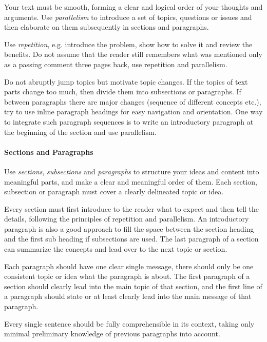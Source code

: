 \documentclass[11pt, a4paper,oneside,chapterprefix=false]{scrbook}
\begin{document}
Your text must be smooth, forming a clear and logical order of your thoughts and arguments. Use \emph{parallelism} to introduce a set of topics, questions or issues and then elaborate on them subsequently in sections and paragraphs.

Use \emph{repetition}, e.g. introduce the problem, show how to solve it and review the benefits. Do not assume that the reader still remembers what was mentioned only as a passing comment three pages back, use repetition and parallelism.

Do not abruptly jump topics but motivate topic changes. If the topics of text parts change too much, then divide them into subsections or paragraphs. If between paragraphs there are major changes (sequence of different concepts etc.), try to use inline paragraph headings for easy navigation and orientation. One way to integrate such paragraph sequences is to write an introductory paragraph at the beginning of the section and use parallelism.

\paragraph*{Sections and Paragraphs}

Use \textit{sections}, \textit{subsections} and \textit{paragraphs} to structure your ideas and content into meaningful parts, and make a clear and meaningful order of them. Each section, subsection or paragraph must cover a clearly delineated topic or idea.

Every section must first introduce to the reader what to expect and then tell the details, following the principles of repetition and parallelism. An introductory paragraph is also a good approach to fill the space between the section heading and the first sub heading if subsections are used. The last paragraph of a section can summarize the concepts and lead over to the next topic or section.

Each paragraph should have one clear single message, there should only be one consistent topic or idea what the paragraph is about. The first paragraph of a section should clearly lead into the main topic of that section, and the first line of a paragraph should state or at least clearly lead into the main message of that paragraph.

Every single sentence should be fully comprehensible in its context, taking only minimal preliminary knowledge of previous paragraphs into account.
\end{document}
